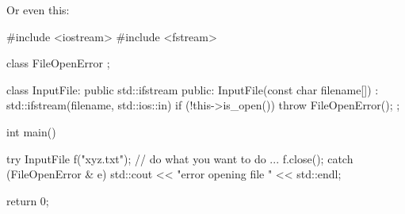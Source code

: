 Or even this:

\begin{console}
#include <iostream>
#include <fstream>

class FileOpenError
{};

class InputFile: public std::ifstream
{
public:
     InputFile(const char filename[])
       : std::ifstream(filename, std::ios::in)
     {
        if (!this->is_open())
           throw FileOpenError();
     }
};

int main()
{   
    try
    {
        InputFile f("xyz.txt");
        // do what you want to do ...
        f.close();
    }
    catch (FileOpenError & e)
    {   
        std::cout << "error opening file "
                  << std::endl;
    }
    
    return 0;

}
\end{console}

